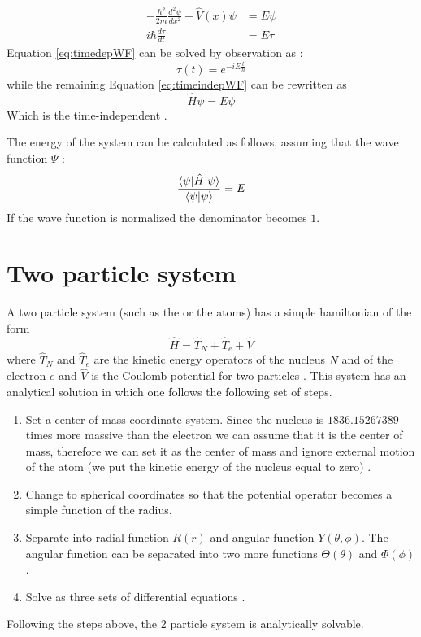 \documentclass[../master_thesis.tex]{subfiles}
\begin{document}
\begin{subequations}
  \label{eq:sysSE}
  \begin{align}
    -\frac{\hbar^2}{2m}\frac{d^2\psi}{d x^2} + \hat{V}(x)\psi &= E\psi  \label{eq:timeindepWF}\\
    i\hbar\frac{d\tau}{d t} &= E\tau  \label{eq:timedepWF}
  \end{align}
\end{subequations}
Equation \ref{eq:timedepWF} can be solved by observation as \cite{Atkins:2011, Cohen:1973} :
\begin{equation}
  \tau(t) = e^{-iE\frac{t}{\hbar}}
\end{equation}
while the remaining Equation \ref{eq:timeindepWF} can be rewritten as
\begin{equation}
  \hat{H}\psi = E\psi\label{eq:timeindepSE}
\end{equation}
Which is the time-independent \SE.

The energy of the system can be calculated as follows, assuming that the wave
function $\Psi$ \cite{Cramer:2004}:
\begin{equation}\label{eq:endevaleq}
  \frac{\braket{\psi|\hat{H}|\psi}}{\braket{\psi|\psi}} = E
\end{equation}
If the wave function is normalized the denominator becomes $1$.

\section{Two particle system}
A two particle system (such as the  or the  atoms) has a simple
hamiltonian of the form
\begin{equation}
  \hat{H}=\hat{T}_{N}+\hat{T}_{e}+\hat{V}
\end{equation}
where $\hat{T}_N$ and $\hat{T}_e$ are the kinetic energy operators of the nucleus $N$ and
of the electron $e$ and $\hat{V}$ is the Coulomb potential for two particles
\cite{Atkins:2014, Jensen:2017}.
This system has an analytical solution in which one follows the following set
of steps.
\begin{enumerate}
  \item Set a center of mass coordinate system. Since the nucleus is
  $1836.152 673 89$ times more massive than the electron \cite{NIST:2019} we can
  assume that it is the center of mass, therefore we can set it as the center of mass
  and ignore external motion of the atom (we put the kinetic energy of the
  nucleus equal to zero) \cite{Jensen:2017, Atkins:2011}.
  \item Change to spherical coordinates so that the potential operator becomes a
  simple function of the radius.
  \item Separate into radial function $R(r)$ and angular function
  $Y(\theta, \phi)$. The angular function can be separated into two more
  functions $\Theta(\theta)$ and $\Phi(\phi)$.
  \item Solve as three sets of differential equations \cite{Simons:2016}.
\end{enumerate}
Following the steps above, the 2 particle system is analytically solvable.
\end{document}
